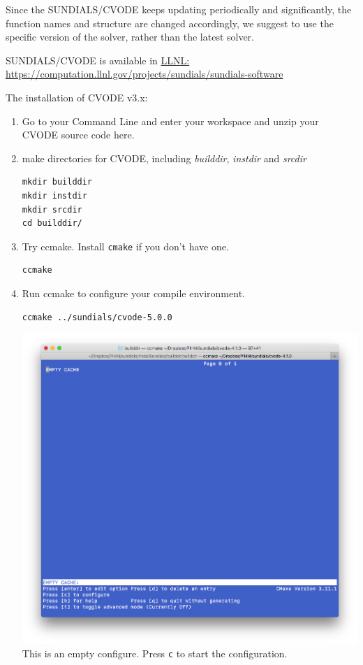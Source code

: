 \documentclass[]{scrbook}
\begin{document}
Since the SUNDIALS/CVODE keeps updating periodically and significantly,
the function names and structure are changed accordingly, we suggest to
use the specific version of the solver, rather than the latest solver.

SUNDIALS/CVODE is available in
\href{https://computation.llnl.gov/projects/sundials/sundials-software}{LLNL:
https://computation.llnl.gov/projects/sundials/sundials-software}

The installation of CVODE v3.x:

\begin{enumerate}
\def\labelenumi{\arabic{enumi}.}
\item
  Go to your Command Line and enter your workspace and unzip your CVODE
  source code here.
\item
  make directories for CVODE, including \emph{builddir}, \emph{instdir}
  and \emph{srcdir}

\begin{verbatim}
mkdir builddir
mkdir instdir
mkdir srcdir
cd builddir/
\end{verbatim}
\item
  Try ccmake. Install \texttt{cmake} if you don't have one.

\begin{verbatim}
ccmake 
\end{verbatim}
\item
  Run ccmake to configure your compile environment.

\begin{verbatim}
ccmake ../sundials/cvode-5.0.0
\end{verbatim}

  \includegraphics{Fig/ccmake/1.png} This is an empty configure. Press
  \texttt{c} to start the configuration.
\end{enumerate}
\end{document}
